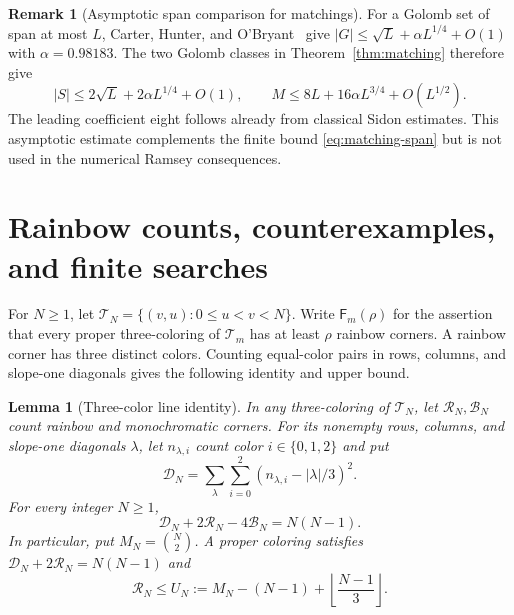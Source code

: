 \documentclass[11pt,a4paper]{article}
\newif\ifshowrevisions
\newcommand{\rev}[1]{{\ifshowrevisions\color{red}\fi #1}}
\newtheorem{lemma}[theorem]{Lemma}
\theoremstyle{definition}
\newtheorem*{remark}{Remark}
\newcommand{\Ttri}{\mathcal T}
\newcommand{\F}{\mathsf F}
\numberwithin{equation}{section}
\begin{document}
\begin{remark}[Asymptotic span comparison for matchings]
For a Golomb set of span at most $L$, Carter, Hunter, and O'Bryant~\cite{CHO25} give $|G|\le\sqrt L+\alpha L^{1/4}+O(1)$ with $\alpha=0.98183$. The two Golomb classes in Theorem~\ref{thm:matching} therefore give
\[
|S|\le2\sqrt L+2\alpha L^{1/4}+O(1),\qquad
M\le8L+16\alpha L^{3/4}+O(L^{1/2}).
\]
The leading coefficient eight follows already from classical Sidon estimates. This asymptotic estimate complements the finite bound \eqref{eq:matching-span} but is not used in the numerical Ramsey consequences.
\end{remark}

\section{\rev{Rainbow counts, counterexamples, and finite searches}}\label{app:rainbow-theory}
For $N\ge1$, let $\Ttri_N=\{(v,u):0\le u<v<N\}$. Write $\F_m(\rho)$ for the assertion that every proper three-coloring of $\Ttri_m$ has at least $\rho$ rainbow corners. A rainbow corner has three distinct colors. Counting equal-color pairs in rows, columns, and slope-one diagonals gives the following identity and upper bound.
\begin{lemma}[Three-color line identity]\label{lem:variance}
	In any three-coloring of $\Ttri_N$, let $\mathcal R_N,\mathcal B_N$ count rainbow and monochromatic corners. For its nonempty rows, columns, and slope-one diagonals $\lambda$, let $n_{\lambda,i}$ count color $i\in\{0,1,2\}$ and put
	\begin{equation}\label{eq:appendix-result-4}
\mathcal D_N=\sum_\lambda\sum_{i=0}^2(n_{\lambda,i}-|\lambda|/3)^2.
\end{equation}
	For every integer $N\ge1$,
	\begin{equation}\label{eq:appendix-result-5}
\mathcal D_N+2\mathcal R_N-4\mathcal B_N=N(N-1).
\end{equation}
	In particular, put $M_N=\binom N2$. A proper coloring satisfies $\mathcal D_N+2\mathcal R_N=N(N-1)$ and
	\begin{equation}\label{eq:appendix-result-6}
\mathcal R_N\le U_N:=M_N-(N-1)+\left\lfloor\frac{N-1}{3}\right\rfloor.
\end{equation}
\end{lemma}
\end{document}
